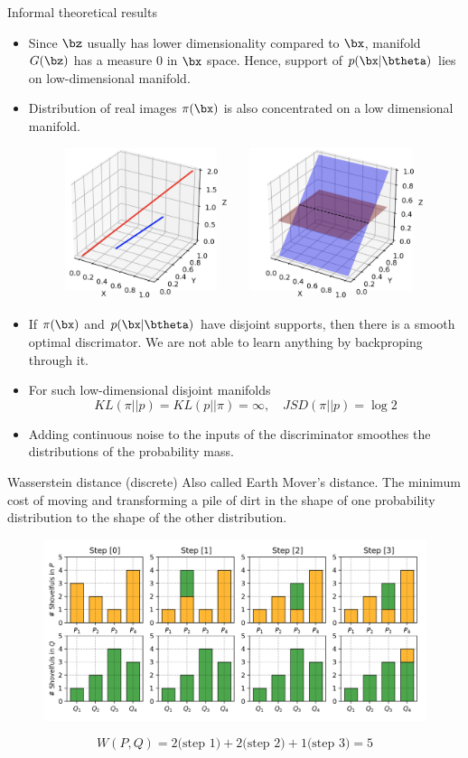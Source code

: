 \begin{frame}{Informal theoretical results}
	\begin{itemize}
		\footnotesize
		\item Since $\bz$ usually has lower dimensionality compared to $\bx$, manifold $G(\bz)$ has a measure 0 in $\bx$ space. Hence, support of $p(\bx | \btheta)$ lies on low-dimensional manifold.
		\item Distribution of real images $\pi(\bx)$ is also concentrated on a low dimensional manifold.
		\begin{figure}
			\centering
			\includegraphics[width=0.5\linewidth]{figs/low_dim_manifold}
		\end{figure}
		\item If $\pi(\bx)$ and $p(\bx | \btheta)$ have disjoint supports, then there is a smooth optimal discrimator. We are not able to learn anything by backproping through it.
		\item For such low-dimensional disjoint manifolds
		\vspace{-0.1cm}
		\[
			KL(\pi || p) = KL(p || \pi) = \infty, \quad JSD(\pi || p) = \log 2
		\]
		\vspace{-0.7cm}
		\item Adding continuous noise to the inputs of the discriminator smoothes the distributions of the probability mass.
	\end{itemize}
\end{frame}
\begin{frame}{Wasserstein distance (discrete)}
	Also called Earth Mover's distance.
	The minimum cost of moving and transforming a pile of dirt in the shape of one probability distribution to the shape of the other distribution.
	\begin{figure}
		\centering
		\includegraphics[width=.9\linewidth]{figs/EM_distance_discrete}
	\end{figure}
	\[
		W(P, Q) = 2 \text{(step 1)} + 2 \text{(step 2)} + 1 \text{(step 3)}  = 5
	\]
	
\end{frame}
